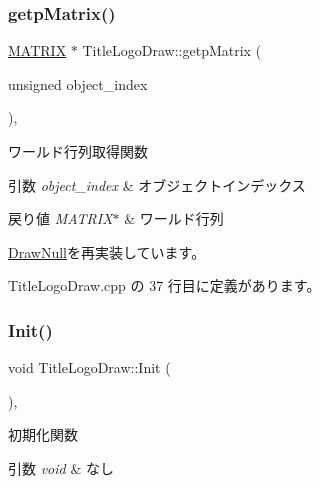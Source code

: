 \subsubsection{\texorpdfstring{getp\+Matrix()}{getpMatrix()}}
{\footnotesize\ttfamily \mbox{\hyperlink{_matrix_8h_a032295cd9fb1b711757c90667278e744}{M\+A\+T\+R\+IX}} $\ast$ Title\+Logo\+Draw\+::getp\+Matrix (\begin{DoxyParamCaption}\item[{unsigned}]{object\+\_\+index }\end{DoxyParamCaption})\hspace{0.3cm}{\ttfamily [override]}, {\ttfamily [virtual]}}



ワールド行列取得関数 


\begin{DoxyParams}{引数}
{\em object\+\_\+index} & オブジェクトインデックス \\
\hline
\end{DoxyParams}

\begin{DoxyRetVals}{戻り値}
{\em M\+A\+T\+R\+I\+X$\ast$} & ワールド行列 \\
\hline
\end{DoxyRetVals}


\mbox{\hyperlink{class_draw_null_a9aac059eb3b5d1f77e8bd3aa0647cff9}{Draw\+Null}}を再実装しています。



 Title\+Logo\+Draw.\+cpp の 37 行目に定義があります。

\mbox{\label{class_title_logo_draw_a9f70fb70639510908f4e07ee14667e30}} 
\subsubsection{\texorpdfstring{Init()}{Init()}}
{\footnotesize\ttfamily void Title\+Logo\+Draw\+::\+Init (\begin{DoxyParamCaption}{ }\end{DoxyParamCaption})\hspace{0.3cm}{\ttfamily [override]}, {\ttfamily [virtual]}}



初期化関数 


\begin{DoxyParams}{引数}
{\em void} & なし \\
\hline
\end{DoxyParams}

